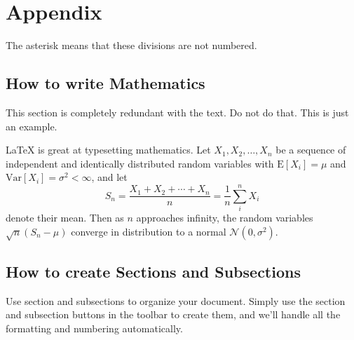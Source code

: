 \documentclass[12pt]{article}
\begin{document}
\bigskip
\section*{Appendix}

The asterisk means that these divisions are not numbered.

\subsection*{How to write Mathematics}

This section is completely redundant with the text. Do not do
that. This is just an example.

\LaTeX{} is great at typesetting mathematics. Let $X_1, X_2, \ldots, X_n$ be a sequence of independent and identically distributed random variables with $\text{E}[X_i] = \mu$ and $\text{Var}[X_i] = \sigma^2 < \infty$, and let
\[S_n = \frac{X_1 + X_2 + \cdots + X_n}{n}
      = \frac{1}{n}\sum_{i}^{n} X_i\]
denote their mean. Then as $n$ approaches infinity, the random variables $\sqrt{n}(S_n - \mu)$ converge in distribution to a normal $\mathcal{N}(0, \sigma^2)$.


\subsection*{How to create Sections and Subsections}

Use section and subsections to organize your document. Simply use the section and subsection buttons in the toolbar to create them, and we'll handle all the formatting and numbering automatically.
\end{document}
